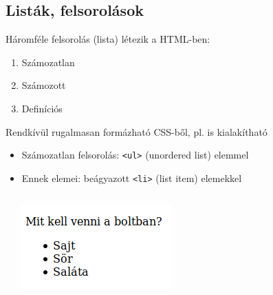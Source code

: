 \subsection{Listák, felsorolások}

\begin{frame}
  Háromféle felsorolás (lista) létezik a HTML-ben:
  \begin{enumerate}
    \item Számozatlan
    \item Számozott
    \item Definíciós
  \end{enumerate}
  \vfill
  Rendkívül rugalmasan formázható CSS-ből, pl.  is kialakítható
\end{frame}

\begin{frame}
  \begin{itemize}
    \item Számozatlan felsorolás: \texttt{<ul>} (unordered list) elemmel
    \item Ennek elemei: beágyazott \texttt{<li>} (list item) elemekkel
  \end{itemize}
  \begin{columns}[T]
      \begin{exampleblock}{}
        \footnotesize
        
      \end{exampleblock}
      \centering \includegraphics[width=\textwidth]{bevasarlas.png}
  \end{columns}
\end{frame}

